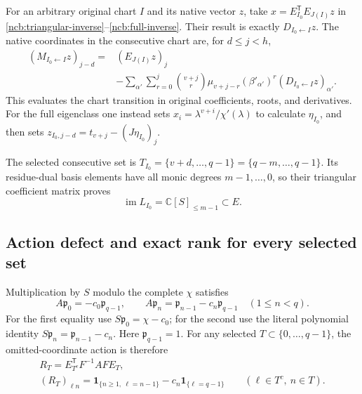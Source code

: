 \documentclass[11pt,a4paper]{article}
\begin{document}
For an arbitrary original chart $I$ and its native vector $z$, take
$x=E_{I_0}^{\mathsf T}E_{J(I)}z$ in
\eqref{ncb:triangular-inverse}--\eqref{ncb:full-inverse}. Their result
is exactly $D_{I_0\leftarrow I}z$. The native coordinates in the
consecutive chart are, for $d\leq j<h$,
\begin{equation}\tag{NCB28}\label{ncb:explicit-transition}
\begin{split}
(M_{I_0\leftarrow I}z)_{j-d}
={}&(E_{J(I)}z)_j\\
&-\sum_{\alpha'}\sum_{r=0}^{j}
\binom{v+j}{r}\mu_{v+j-r}(\beta'_{\alpha'})^r
                    (D_{I_0\leftarrow I}z)_{\alpha'} .
\end{split}
\end{equation}
This evaluates the chart transition in original coefficients, roots,
and derivatives. For the full eigenclass one instead sets
$x_i=\lambda^{v+i}/\chi'(\lambda)$ to calculate $\eta_{I_0}$,
and then sets
$z_{I_0,j-d}=t_{v+j}-(J\eta_{I_0})_j$.

The selected consecutive set is
$T_{I_0}=\{v+d,\ldots,q-1\}=\{q-m,\ldots,q-1\}$.
Its residue-dual basis elements have all monic degrees
$m-1,\ldots,0$, so their triangular coefficient matrix proves
\begin{equation}\tag{NCB29}\label{ncb:consecutive-image}
\operatorname{im}L_{I_0}=\mathbb C[S]_{\leq m-1}\subset E .
\end{equation}

\subsection{Action defect and exact rank for every selected set}
Multiplication by $S$ modulo the complete $\chi$ satisfies
\begin{equation}\tag{NCB30}\label{ncb:action}
A\mathfrak p_0=-c_0\mathfrak p_{q-1},\qquad
A\mathfrak p_n=\mathfrak p_{n-1}-c_n\mathfrak p_{q-1}
\quad(1\leq n<q).
\end{equation}
For the first equality use $S\mathfrak p_0=\chi-c_0$;
for the second use the literal polynomial identity
$S\mathfrak p_n=\mathfrak p_{n-1}-c_n$.
Here $\mathfrak p_{q-1}=1$.
For any selected $T\subset\{0,\ldots,q-1\}$, the omitted-coordinate
action is therefore
\begin{equation}\tag{NCB31}\label{ncb:RT}
\begin{gathered}
R_T=E_{T^c}^{\mathsf T}F^{-1}AFE_T,\\
(R_T)_{\ell n}
=\mathbf1_{\{n\geq1,\ \ell=n-1\}}
       -c_n\mathbf1_{\{\ell=q-1\}}
\qquad(\ell\in T^c,\ n\in T).
\end{gathered}
\end{equation}
\end{document}
